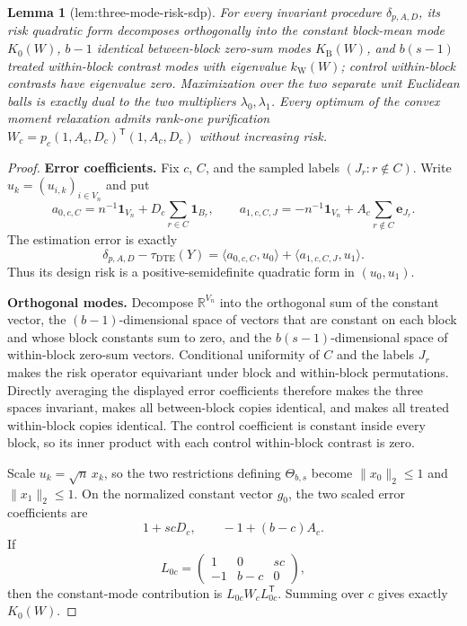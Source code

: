 \documentclass{article}
\newtheorem{lemma}{Lemma}
\begin{document}
\begin{lemma}[lem:three-mode-risk-sdp]\label{lem:three-mode-risk-sdp}
For every invariant procedure \(\delta_{p,A,D}\), its risk quadratic form decomposes orthogonally into the constant block-mean mode \(K_0(W)\), \(b-1\) identical between-block zero-sum modes \(K_{\mathrm B}(W)\), and \(b(s-1)\) treated within-block contrast modes with eigenvalue \(k_{\mathrm W}(W)\); control within-block contrasts have eigenvalue zero. Maximization over the two separate unit Euclidean balls is exactly dual to the two multipliers \(\lambda_0,\lambda_1\). Every optimum of the convex moment relaxation admits rank-one purification \(W_c=p_c(1,A_c,D_c)^{\mathsf T}(1,A_c,D_c)\) without increasing risk.
\end{lemma}
\begin{proof}
\textbf{Error coefficients.} Fix \(c\), \(C\), and the sampled labels \((J_r:r\notin C)\). Write \(u_k=(u_{i,k})_{i\in V_n}\) and put
\[
a_{0,c,C}=n^{-1}\mathbf 1_{V_n}+D_c\sum_{r\in C}\mathbf 1_{B_r},
\qquad
a_{1,c,C,J}=-n^{-1}\mathbf 1_{V_n}+A_c\sum_{r\notin C}\mathbf e_{J_r}.
\]
The estimation error is exactly
\[
\delta_{p,A,D}-\tau_{\mathrm{DTE}}(Y)
=\langle a_{0,c,C},u_0\rangle+\langle a_{1,c,C,J},u_1\rangle.
\]
Thus its design risk is a positive-semidefinite quadratic form in \((u_0,u_1)\).

\textbf{Orthogonal modes.} Decompose \(\mathbb R^{V_n}\) into the orthogonal sum of the constant vector, the \((b-1)\)-dimensional space of vectors that are constant on each block and whose block constants sum to zero, and the \(b(s-1)\)-dimensional space of within-block zero-sum vectors. Conditional uniformity of \(C\) and the labels \(J_r\) makes the risk operator equivariant under block and within-block permutations. Directly averaging the displayed error coefficients therefore makes the three spaces invariant, makes all between-block copies identical, and makes all treated within-block copies identical. The control coefficient is constant inside every block, so its inner product with each control within-block contrast is zero.

Scale \(u_k=\sqrt n\,x_k\), so the two restrictions defining \(\Theta_{b,s}\) become \(\|x_0\|_2\le1\) and \(\|x_1\|_2\le1\). On the normalized constant vector \(g_0\), the two scaled error coefficients are
\[
1+scD_c,
\qquad
-1+(b-c)A_c.
\]
If
\[
L_{0c}=\begin{pmatrix}1&0&sc\\-1&b-c&0\end{pmatrix},
\]
then the constant-mode contribution is \(L_{0c}W_cL_{0c}^{\mathsf T}\). Summing over \(c\) gives exactly \(K_0(W)\).


\end{proof}
\end{document}
